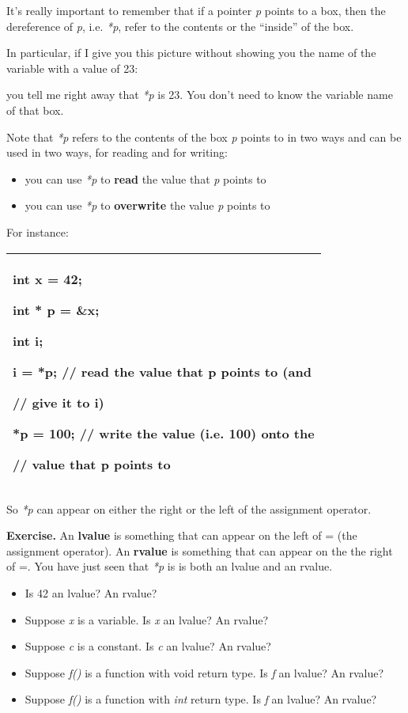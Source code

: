 \documentclass[
]{article}
\providecommand{\tightlist}{%
  \setlength{\itemsep}{0pt}\setlength{\parskip}{0pt}}
\begin{document}
It's really important to remember that if a pointer \emph{p} points to a
box, then the dereference of \emph{p}, i.e. \emph{*p}, refer to the
contents or the ``inside'' of the box.

In particular, if I give you this picture without showing you the name
of the variable with a value of 23:

you tell me right away that \emph{*p} is 23. You don't need to know the
variable name of that box.

Note that \emph{*p} refers to the contents of the box \emph{p} points to
in two ways and can be used in two ways, for reading and for writing:

\begin{itemize}
\tightlist
\item
  you can use \emph{*p} to \textbf{read} the value that \emph{p} points
  to
\item
  you can use \emph{*p} to \textbf{overwrite} the value \emph{p} points
  to
\end{itemize}

For instance:

\begin{longtable}[]{@{}l@{}}
\toprule
\endhead
\begin{minipage}[t]{0.97\columnwidth}\raggedright
int x = 42;

int * p = \&x;

int i;

i = *p; // read the value that p points to (and

// give it to i)

*p = 100; // write the value (i.e. 100) onto the

// value that p points to\strut
\end{minipage}\tabularnewline
\bottomrule
\end{longtable}

So \emph{*p} can appear on either the right or the left of the
assignment operator.

\hfill\break

\textbf{Exercise.} An \textbf{lvalue} is something that can appear on
the left of = (the assignment operator). An \textbf{rvalue} is something
that can appear on the the right of =. You have just seen that \emph{*p}
is is both an lvalue and an rvalue.

\begin{itemize}
\tightlist
\item
  Is 42 an lvalue? An rvalue?
\item
  Suppose \emph{x} is a variable. Is \emph{x} an lvalue? An rvalue?
\item
  Suppose \emph{c} is a constant. Is \emph{c} an lvalue? An rvalue?
\item
  Suppose \emph{f()} is a function with void return type. Is \emph{f} an
  lvalue? An rvalue?
\item
  Suppose \emph{f()} is a function with \emph{int} return type. Is
  \emph{f} an lvalue? An rvalue?
\end{itemize}
\end{document}
